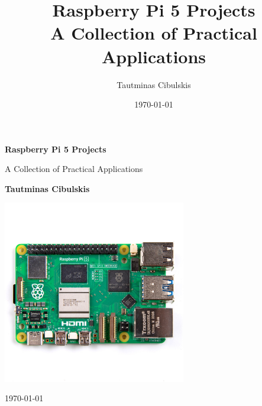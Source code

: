 \documentclass[a4paper,12pt]{article}
\title{\textbf{Raspberry Pi 5 Projects} \\ \Large A Collection of Practical Applications}
\author{Tautminas Cibulskis}
\date{\today}
\begin{document}
\begin{titlepage}
    \centering
    \vspace*{2cm}
    {\Huge \textbf{Raspberry Pi 5 Projects} \par}
    \vspace{0.5cm}
    {\Large A Collection of Practical Applications\par}
    \vspace{2cm}
    {\Large \textbf{Tautminas Cibulskis} \par}
    \vspace{1.5cm}
    \includegraphics[width=0.6\textwidth]{images/raspberry-pi-5.jpg}
    \vfill
    {\large \today\par}
\end{titlepage}

\renewcommand{\cftsecleader}{\cftdotfill{\cftdotsep}}

\tableofcontents









\end{document}
